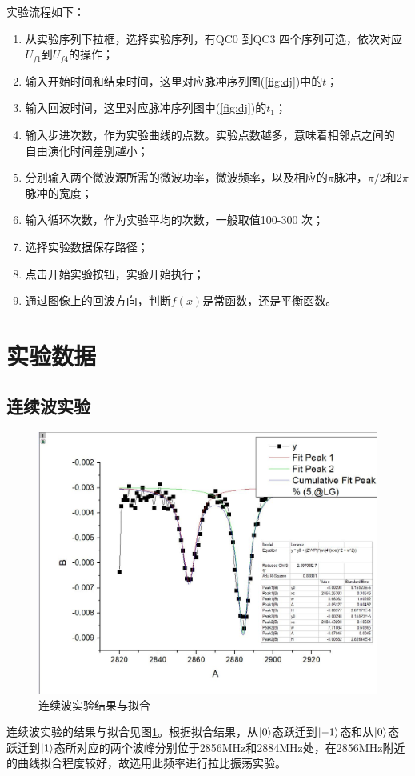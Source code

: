 \documentclass[a4paper]{article}
\begin{document}
实验流程如下：
\begin{enumerate}
	\item 从实验序列下拉框，选择实验序列，有QC0 到QC3 四个序列可选，依次对应
	$ U_{f 1 } $到$ U_{f 4 } $的操作；
	\item 输入开始时间和结束时间，这里对应脉冲序列图(\ref{fig:dj})中的$ t $；
	\item 输入回波时间，这里对应脉冲序列图中(\ref{fig:dj})的$ t_1 $；
	\item 输入步进次数，作为实验曲线的点数。实验点数越多，意味着相邻点之间的
	自由演化时间差别越小；
	\item 分别输入两个微波源所需的微波功率，微波频率，以及相应的$ \pi $脉冲，$ \pi/2 $和$ 	2\pi  $脉冲的宽度；
	\item 输入循环次数，作为实验平均的次数，一般取值100-300 次；
	\item 选择实验数据保存路径；
	\item 点击开始实验按钮，实验开始执行；
	\item 通过图像上的回波方向，判断$ f (x)  $是常函数，还是平衡函数。
\end{enumerate}

\section{实验数据}

\subsection{连续波实验}
\begin{figure}[htbp]
	\centering
	\includegraphics[width=0.7\linewidth]{data/1/1.JPG}
	\caption{连续波实验结果与拟合}
	\label{fig:s11}
\end{figure}
连续波实验的结果与拟合见图\ref{fig:s11}。根据拟合结果，从$\ket{0}$态跃迁到$\ket{-1}$态和从$\ket{0}$态跃迁到$\ket{1}$态所对应的两个波峰分别位于2856MHz和2884MHz处，在2856MHz附近的曲线拟合程度较好，故选用此频率进行拉比振荡实验。
\end{document}
